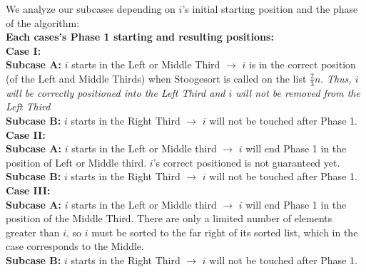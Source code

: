 \documentclass[11pt, solution, letterpaper]{format}
\begin{document}
We analyze our subcases depending on $i$'s initial starting position and the phase of the algorithm: \\
\textbf{Each cases's Phase 1 starting and resulting positions:}\\
\textbf{Case I:}\\
\textbf{Subcase A:} $i$ starts in the Left or Middle Third $\rightarrow$ $i$ is in the correct position (of the Left and Middle Thirds) when Stoogesort is called on the list $\frac{2}{3}n$.  \emph{Thus, $i$ will be correctly positioned into the Left Third and $i$ will not be removed from the Left Third}\\
\textbf{Subcase B:} $i$ starts in the Right Third $\rightarrow$ $i$ will not be touched after Phase 1.\\
\textbf{Case II:}\\
\textbf{Subcase A:} $i$ starts in the Left or Middle third $\rightarrow$ $i$ will end Phase 1 in the position of Left or Middle third. $i$'s correct positioned is not guaranteed yet.\\
\textbf{Subcase B:} $i$ starts in the Right Third $\rightarrow$ $i$ will not be touched after Phase 1.\\
\textbf{Case III:}\\
    \textbf{Subcase A:} $i$ starts in the Left or Middle third $\rightarrow$ $i$ will end Phase 1 in the position of the Middle Third. There are only a limited number of elements greater than $i$, so $i$ must be sorted to the far right of its sorted list, which in the case corresponds to the Middle.\\
    \textbf{Subcase B:} $i$ starts in the Right Third $\rightarrow$ $i$ will not be touched after Phase 1.\\
\end{document}
